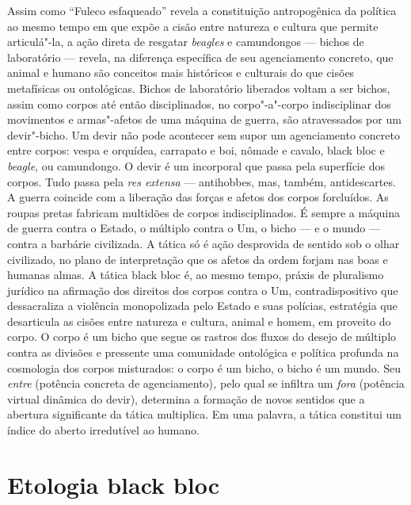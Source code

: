 Assim como ``Fuleco esfaqueado'' revela a constituição antropogênica da
política ao mesmo tempo em que expõe a cisão entre natureza e cultura
que permite articulá"-la, a ação direta de resgatar \emph{beagles }e
camundongos --- bichos de laboratório --- revela, na diferença específica
de seu agenciamento concreto, que animal e humano são conceitos mais
históricos e culturais do que cisões metafísicas ou ontológicas. Bichos
de laboratório liberados voltam a ser bichos, assim como corpos até
então disciplinados, no corpo"-a"-corpo indisciplinar dos movimentos e
armas"-afetos de uma máquina de guerra, são atravessados por um
devir"-bicho. Um devir não pode acontecer sem supor um agenciamento
concreto entre corpos: vespa e orquídea, carrapato e boi, nômade e
cavalo, black bloc e \emph{beagle}, ou camundongo. O devir é um
incorporal que passa pela superfície dos corpos. Tudo passa pela
\emph{res extensa} --- antihobbes, mas, também, antidescartes. A guerra
coincide com a liberação das forças e afetos dos corpos forcluídos. As
roupas pretas fabricam multidões de corpos indisciplinados. É sempre a
máquina de guerra contra o Estado, o múltiplo contra o Um, o bicho --- e
o mundo --- contra a barbárie civilizada. A tática só é ação desprovida
de sentido sob o olhar civilizado, no plano de interpretação que os
afetos da ordem forjam nas boas e humanas almas. A tática black bloc é,
ao mesmo tempo, práxis de pluralismo jurídico na afirmação dos direitos
dos corpos contra o Um, contradispositivo que dessacraliza a violência
monopolizada pelo Estado e suas polícias, estratégia que desarticula as
cisões entre natureza e cultura, animal e homem, em proveito do corpo. O
corpo é um bicho que segue os rastros dos fluxos do desejo de múltiplo
contra as divisões e pressente uma comunidade ontológica e política
profunda na cosmologia dos corpos misturados: o corpo é um bicho, o
bicho é um mundo. Seu \emph{entre }(potência concreta de
agenciamento)\emph{,} pelo qual se infiltra um \emph{fora }(potência
virtual dinâmica do devir), determina a formação de novos sentidos que a
abertura significante da tática multiplica. Em uma palavra, a tática
constitui um índice do aberto irredutível ao humano.

\chapter{Etologia black bloc}



